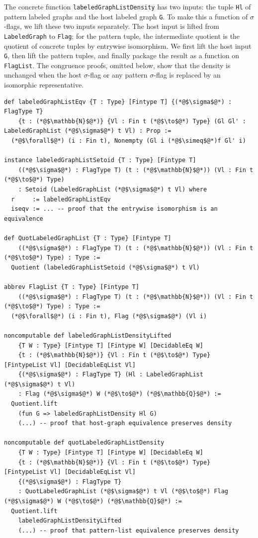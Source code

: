 \documentclass{article}
\newcommand{\lean}[1]{\texttt{#1}}
\begin{document}
The concrete function \lean{labeledGraphListDensity} has two inputs: the tuple
\lean{Hl} of pattern labeled graphs and the host labeled graph \lean{G}.  To
make this a function of $\sigma$-flags, we lift these two inputs separately.  The host
input is lifted from \lean{LabeledGraph} to \lean{Flag}; for the pattern tuple,
the intermediate quotient is the quotient of concrete tuples by entrywise
isomorphism.  We first lift the host input \lean{G}, then lift the pattern
tuples, and finally package the result as a function on \lean{FlagList}.  The
congruence proofs, omitted below, show that the density is unchanged when the
host $\sigma$-flag or any pattern $\sigma$-flag is replaced by an isomorphic
representative.
\begin{lstlisting}
def labeledGraphListEqv {T : Type} [Fintype T] {(*@$\sigma$@*) : FlagType T}
    {t : (*@$\mathbb{N}$@*)} {Vl : Fin t (*@$\to$@*) Type} (Gl Gl' : LabeledGraphList (*@$\sigma$@*) t Vl) : Prop :=
  (*@$\forall$@*) (i : Fin t), Nonempty (Gl i (*@$\simeq$@*)f Gl' i)

instance labeledGraphListSetoid {T : Type} [Fintype T]
    ((*@$\sigma$@*) : FlagType T) (t : (*@$\mathbb{N}$@*)) (Vl : Fin t (*@$\to$@*) Type)
    : Setoid (LabeledGraphList (*@$\sigma$@*) t Vl) where
  r     := labeledGraphListEqv
  iseqv := ... -- proof that the entrywise isomorphism is an equivalence

def QuotLabeledGraphList {T : Type} [Fintype T]
    ((*@$\sigma$@*) : FlagType T) (t : (*@$\mathbb{N}$@*)) (Vl : Fin t (*@$\to$@*) Type) : Type :=
  Quotient (labeledGraphListSetoid (*@$\sigma$@*) t Vl)

abbrev FlagList {T : Type} [Fintype T]
    ((*@$\sigma$@*) : FlagType T) (t : (*@$\mathbb{N}$@*)) (Vl : Fin t (*@$\to$@*) Type) : Type :=
  (*@$\forall$@*) (i : Fin t), Flag (*@$\sigma$@*) (Vl i)

noncomputable def labeledGraphListDensityLifted
    {T W : Type} [Fintype T] [Fintype W] [DecidableEq W]
    {t : (*@$\mathbb{N}$@*)} {Vl : Fin t (*@$\to$@*) Type} [FintypeList Vl] [DecidableEqList Vl]
    {(*@$\sigma$@*) : FlagType T} (Hl : LabeledGraphList (*@$\sigma$@*) t Vl)
    : Flag (*@$\sigma$@*) W (*@$\to$@*) (*@$\mathbb{Q}$@*) :=
  Quotient.lift
    (fun G => labeledGraphListDensity Hl G)
    (...) -- proof that host-graph equivalence preserves density

noncomputable def quotLabeledGraphListDensity
    {T W : Type} [Fintype T] [Fintype W] [DecidableEq W]
    {t : (*@$\mathbb{N}$@*)} {Vl : Fin t (*@$\to$@*) Type} [FintypeList Vl] [DecidableEqList Vl]
    {(*@$\sigma$@*) : FlagType T}
    : QuotLabeledGraphList (*@$\sigma$@*) t Vl (*@$\to$@*) Flag (*@$\sigma$@*) W (*@$\to$@*) (*@$\mathbb{Q}$@*) :=
  Quotient.lift
    labeledGraphListDensityLifted
    (...) -- proof that pattern-list equivalence preserves density


\end{lstlisting}
\end{document}
